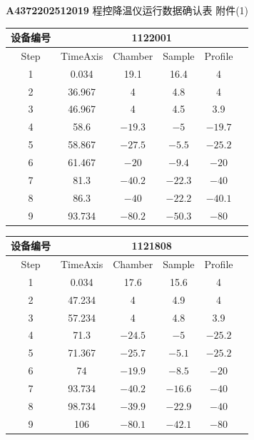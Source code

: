 \documentclass[UTF8,10pt,a4paper,fontset=fandol]{ctexart}
\newcommand{\handwritten}[1]{#1}
\begin{document}
\begin{center}
\textbf{A4372202512019} 程控降温仪运行数据确认表\hspace{1em}%
\handwritten{附件(1)}
\end{center}

\begin{center}
\small
\begin{tabular}{|c|c|c|c|c|c|}
\hline
\multicolumn{1}{|c|}{设备编号} & \multicolumn{5}{c|}{1122001} \\
\hline
Step & TimeAxis & Chamber & Sample & Profile \\
\hline
1 & 0.034 & 19.1 & 16.4 & 4 \\
\hline
2 & 36.967 & 4 & 4.8 & 4 \\
\hline
3 & 46.967 & 4 & 4.5 & 3.9 \\
\hline
4 & 58.6 & $-19.3$ & $-5$ & $-19.7$ \\
\hline
5 & 58.867 & $-27.5$ & $-5.5$ & $-25.2$ \\
\hline
6 & 61.467 & $-20$ & $-9.4$ & $-20$ \\
\hline
7 & 81.3 & $-40.2$ & $-22.3$ & $-40$ \\
\hline
8 & 86.3 & $-40$ & $-22.2$ & $-40.1$ \\
\hline
9 & 93.734 & $-80.2$ & $-50.3$ & $-80$ \\
\hline
\end{tabular}
\end{center}

\begin{center}
\small
\begin{tabular}{|c|c|c|c|c|c|}
\hline
\multicolumn{1}{|c|}{设备编号} & \multicolumn{5}{c|}{1121808} \\
\hline
Step & TimeAxis & Chamber & Sample & Profile \\
\hline
1 & 0.034 & 17.6 & 15.6 & 4 \\
\hline
2 & 47.234 & 4 & 4.9 & 4 \\
\hline
3 & 57.234 & 4 & 4.8 & 3.9 \\
\hline
4 & 71.3 & $-24.5$ & $-5$ & $-25.2$ \\
\hline
5 & 71.367 & $-25.7$ & $-5.1$ & $-25.2$ \\
\hline
6 & 74 & $-19.9$ & $-8.5$ & $-20$ \\
\hline
7 & 93.734 & $-40.2$ & $-16.6$ & $-40$ \\
\hline
8 & 98.734 & $-39.9$ & $-22.9$ & $-40$ \\
\hline
9 & 106 & $-80.1$ & $-42.1$ & $-80$ \\
\hline
\end{tabular}
\end{center}
\end{document}
